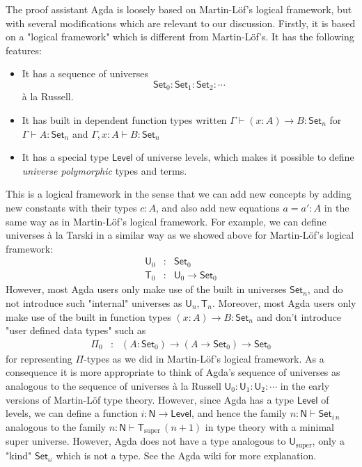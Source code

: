 \documentclass[11pt,a4paper]{article}
\def\UU{\mathsf{U}}
\def\Level{\mathsf{Level}}
\newcommand{\N}{\mathsf{N}}
\newcommand{\Set}{\mathsf{Set}}
\newcommand{\T}{\mathsf{T}}
\newcommand{\Usuper}{\UU_{\mathrm{super}}}
\newcommand{\Tsuper}{\T_{\mathrm{super}}}
\begin{document}
The proof assistant Agda is loosely based on Martin-Löf's logical framework, but with several modifications which are relevant to our discussion. Firstly, it is based on a "logical framework" which is different from Martin-Löf's. It has the following features:
\begin{itemize}
\item It has a sequence of universes  $$\Set_0 : \Set_1 : \Set_2 : \cdots$$  \`a la Russell.
\item It has built in dependent function types written $\Gamma \vdash (x : A)\to B : \Set_n$ for $\Gamma \vdash A : \Set_n$ and $\Gamma , x : A \vdash B : \Set_n$
\item It has a special type $\Level$ of universe levels, which makes it possible to define {\em universe polymorphic} types and terms.
\end{itemize}
This is a logical framework in the sense that we can add new concepts by adding new constants with their types $c : A$, and also add new equations $a = a' : A$ in the same way as in Martin-Löf's logical framework. For example, we can define universes \`a la Tarski in a similar way as we showed above for Martin-Löf's logical framework:
\begin{eqnarray*}
\UU_0 &: &\Set_0\\
\T_0 &:& \UU_0 \to \Set_0
\end{eqnarray*}
However, most Agda users only make use of the built in universes $\Set_n$, and do not introduce such "internal" universes as $\UU_n, \T_n$. Moreover, most Agda users only make use of the built in function types $(x : A)\to B : \Set_n$ and don't introduce "user defined data types" such as
\begin{eqnarray*}
\Pi_0 &:& (A:\Set_0) \to (A \to \Set_0) \to \Set_0
\end{eqnarray*}
for representing $\Pi$-types as we did in Martin-Löf's logical framework. As a consequence it is more appropriate to think of Agda's sequence of universes as analogous to the sequence of universes  \`a la Russell $ \UU_0 : \UU_1 : \UU_2 : \cdots$ in the early versions of Martin-Löf type theory. However, since Agda has a type $\Level$ of levels, we can define a function $i : \N \to \Level$, and hence the family $n : \N \vdash \Set_{i\, n}$ analogous to the family $n : \N \vdash \Tsuper\,(n + 1)$ in type theory with a minimal super universe. However, Agda does not have a type analogous to $\Usuper$, only a "kind" $\Set_\omega$ which is not a type. See the Agda wiki for more explanation.
\end{document}

